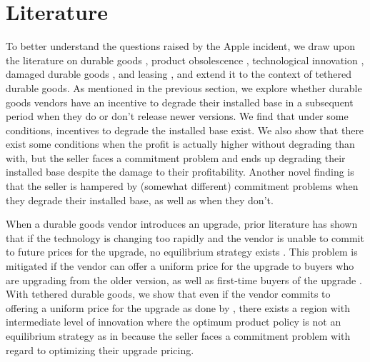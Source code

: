 \documentclass[isre,blindrev]{informs3} %
\begin{document}
\section{Literature}

To better understand the questions raised by the Apple incident, we draw upon the literature on durable goods \citep{coase_durability_1972, stokey_rational_1981}, product obsolescence \citep{bulow_economic_1986, waldman_new_1993}, technological innovation \citep{dhebar_durable-goods_1994, kornish_pricing_2001}, damaged durable goods \citep{deneckere_damaged_1996, hahn_damaged_2006}, and leasing \citep{bhaskaran_selling_2005}, and extend it to the context of tethered durable goods. As mentioned in the previous section, we explore whether durable goods vendors have an incentive to degrade their installed base in a subsequent period when they do or don't release newer versions. We find that under some conditions, incentives to degrade the installed base exist. We also show that there exist some conditions when the profit is actually higher without degrading than with, but the seller faces a commitment problem
and ends up degrading their installed base despite the damage to their profitability. Another novel finding is that the seller is hampered by (somewhat different) commitment problems when they degrade their installed base, as well as when they don't.

When a durable goods vendor introduces an upgrade, prior literature has shown that if the technology is changing too rapidly and the vendor is unable to commit to future prices for the upgrade, no equilibrium strategy exists \citep{dhebar_durable-goods_1994}. This problem is mitigated if the vendor can offer a uniform price for the upgrade to buyers who are upgrading from the older version, as well as first-time buyers of the upgrade \citep{kornish_pricing_2001}. With tethered durable goods, we show that even if the vendor commits to offering a uniform price for the upgrade as done by \cite{kornish_pricing_2001}, there exists a region with intermediate level of innovation where the optimum product policy is not an equilibrium strategy as in \cite{dhebar_durable-goods_1994} because the seller faces a commitment problem with regard to optimizing their upgrade pricing.
\end{document}
